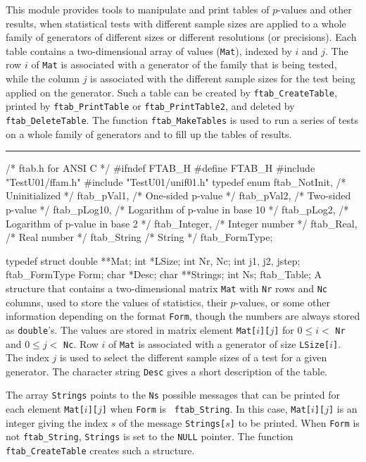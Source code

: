 
This module provides tools to manipulate and print tables of $p$-values
and other results, when statistical tests with different sample sizes are
applied to a whole family of generators of different sizes or different
resolutions (or precisions). Each table contains a two-dimensional array of
values ({\tt Mat}), indexed by $i$ and $j$. The row $i$ of {\tt Mat} is
associated with a generator of the family that is being tested, while the
column $j$ is associated with the different sample sizes for the test
being applied on the generator. Such a table can be created by 
{\tt ftab\_CreateTable}, printed by {\tt ftab\_PrintTable} or
{\tt ftab\_PrintTable2}, and deleted by {\tt ftab\_DeleteTable}.
The function {\tt ftab\_MakeTables} is used to run a series of tests on a
whole family of generators and to fill up the tables of results.

\bigskip
\hrule
\code\hide
/* ftab.h for ANSI C */
#ifndef FTAB_H
#define FTAB_H
\endhide
#include "TestU01/ffam.h"
#include "TestU01/unif01.h"
\endcode
\code
\hide
typedef enum {
   ftab_NotInit,              /* Uninitialized */
   ftab_pVal1,                /* One-sided p-value */
   ftab_pVal2,                /* Two-sided p-value */
   ftab_pLog10,               /* Logarithm of p-value in base 10 */
   ftab_pLog2,                /* Logarithm of p-value in base 2 */
   ftab_Integer,              /* Integer number */
   ftab_Real,                 /* Real number */
   ftab_String                /* String */
} ftab_FormType;
\endhide

typedef struct {
   double **Mat;
   int *LSize;
   int Nr, Nc;
   int j1, j2, jstep;
   ftab_FormType Form;
   char *Desc;
   char **Strings;
   int Ns;
} ftab_Table;
\endcode
 \tab
  A structure that contains a two-dimensional matrix {\tt Mat} with {\tt Nr}
  rows and {\tt Nc} columns, used to store the values of statistics, their
  $p$-values, or some other information depending on the format {\tt Form},
  though the numbers are always stored as {\tt double}'s.
  The values are stored in matrix element {\tt Mat[$i$][$j$]} for
  $0 \le i <$ {\tt Nr} and $0 \le j <$ {\tt Nc}. Row $i$ of {\tt Mat}
  is associated with a generator of size {\tt LSize[$i$]}. The index $j$ is
  used to select the different sample sizes of a test for a given
  generator. The character string {\tt Desc} gives a short description of
  the table.

  The array {\tt Strings} points to the {\tt Ns} possible messages that can
  be printed for each element {\tt Mat[$i$][$j$]} when {\tt Form} is {\tt
  ftab\_String}. In this case, {\tt Mat[$i$][$j$]} is an integer giving the
  index $s$ of the message {\tt Strings[$s$]} to be printed. When {\tt Form}
  is not {\tt ftab\_String}, {\tt Strings} is set to the {\tt NULL}
  pointer.
  The function {\tt ftab\_CreateTable} creates such a structure.
 \endtab




